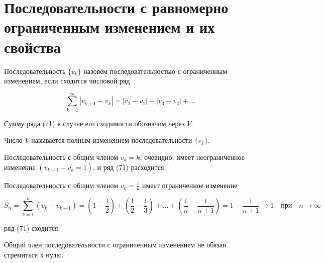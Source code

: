 \section{Последовательности с равномерно ограниченным изменением и их свойства}

\setcounter{exmpl}{0}

\begin{definition}
	Последовательность $\{v_k\}$ назовём последовательностью с ограниченным изменением, если сходится числовой ряд
	
	\begin{equation}
		\displaystyle\sum_{k = 1}^\infty |v_{k + 1} - v_k| = |v_2 - v_1| + |v_3 - v_2| + ...
	\end{equation}
	
	Сумму ряда (71) в случае его сходимости обозначим через $V$.
\end{definition}

\begin{definition}
	Число $V$ называется полным изменением последовательности $\{v_k\}$.
\end{definition}

\begin{exmpl}
	Последовательность с общим членом $v_k = k$, очевидно, имеет неограниченное изменение $(v_{k +  1} - v_k = 1)$, и ряд (71) расходится.
\end{exmpl}

\begin{exmpl}
	Последовательность с общим членом $v_k = \frac{1}{k}$ имеет ограниченное изменение
	
	\begin{equation}
		S_n = \displaystyle\sum_{k = 1}^n (v_k - v_{k + 1}) = \left( 1 - \frac{1}{2} \right) + \left( \frac{1}{2} - \frac{1}{3} \right) + ... + \left( \frac{1}{n} - \frac{1}{n + 1} \right) = 1 - \frac{1}{n + 1} \rightarrow 1 \quad \mbox{при} \quad n \rightarrow \infty
	\end{equation}
	
	ряд (71) сходится.
\end{exmpl}

Общий член последовательности с ограниченным изменением не обязан стремиться к нулю.

